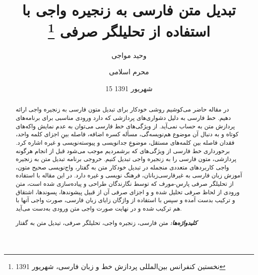 \documentclass[12pt,onecolumn,a4paper]{article}
\providecommand{\keywords}[1]{\textbf{\textit{کلیدواژه‌ها:}} #1}
\begin{document}
    \title{تبدیل متن فارسی به زنجیره واجی با استفاده از تحلیلگر صرفی \footnote{نخستین کنفرانس بین‌المللی پردازش خط و زبان فارسی، شهریور 1391}}
    \author[1]{وحید مواجی}
    \author[2]{محرم اسلامی}
    \date{15 شهریور 1391}
    \maketitle

    \begin{abstract}
        در مقاله حاضر می‌کوشیم روشی خودکار برای تبدیل متون فارسی به زنجیره واجی ارائه دهیم. خط فارسی به دلیل دشواری‌های پردازشی که دارد ورودی مناسبی برای برنامه‌های پردازش متن به حساب نمی‌آید. از ویژگی‌های خط فارسی می‌توان به عدم نمایش واکه‌های کوتاه و به دنبال آن موضوع هم‌نویسه‌گی، مسأله کسره اضافه، فاصله بینِ اجزای کلمه واحد، فقدان فاصله بین کلمه‌های مستقل، موضوعِ جدانویسی و پیوسته‌نویسی و غیره اشاره کرد. برخورداری خط فارسی از ویژگی‌های که برشمردیم موجب می‌شود قبل از انجام هرگونه پردازشی، متون فارسی را به زنجیره واجی تبدیل کنیم. خروجی برنامه تبدیل متن به زنجیره واجی کاربردهای متعددی منجمله در تبدیل خودکار متن به گفتار، واج‌نویسی صحیح متون، آموزش زبان فارسی به غیرفارسی‌زبانان، فرهنگ نویسی و غیره دارد. در این مقاله با استفاده از تحلیلگر صرفی پارس-مورف که توسط نگارندگان طراحی و پیاده‌سازی شده است، متن ورودی از لحاظ صرفی تحلیل شده و و اجزای صرفی آن از قبیل پیشوندها، پسوندها، اشتقاق و ترکیب بدست آمده و سپس با استفاده از واژگان زایای زبان فارسی، صورت واجی‌ آنها با هم ترکیب شده و در نهایت صورت واجی متن ورودی به‌دست می‌آید.
        \par
        \keywords{متن فارسی، زنجیره واجی، تحلیلگر صرفی، تیدیل متن به گفتار}
    \end{abstract}
\end{document}

